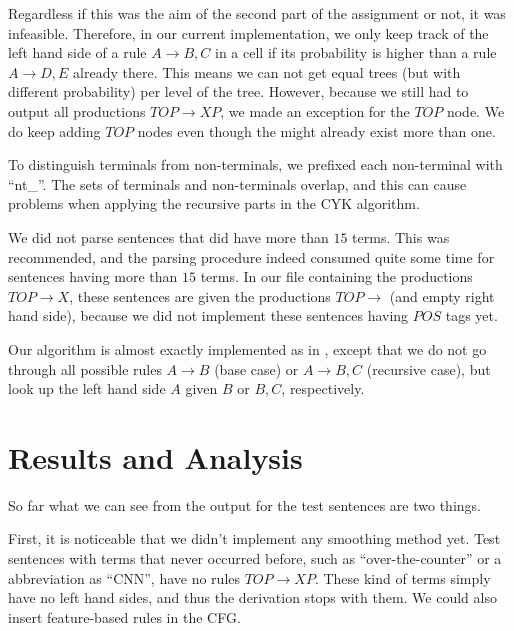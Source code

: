 \documentclass[11pt,twocolumn]{article}
\begin{document}
Regardless if this was the aim of the second part of the assignment or not, it was infeasible. Therefore, in our current implementation, we only keep track of the left hand side of a rule $A \rightarrow B, C$ in a cell if its probability is higher than a rule  $A \rightarrow D, E$ already there. This means we can not get equal trees (but with different probability) per level of the tree. However, because we still had to output all productions  $TOP \rightarrow \mathit{XP}$, we made an exception for the $TOP$ node. We do keep adding $TOP$ nodes even though the might already exist more than one.

To distinguish terminals from non-terminals, we prefixed each non-terminal with ``nt\_''. The sets of terminals and non-terminals overlap, and this can cause problems when applying the recursive parts in the CYK algorithm.

We did not parse sentences that did have more than $15$ terms. This was recommended, and the parsing procedure indeed consumed quite some time for sentences having more than $15$ terms. In our file containing the productions $TOP \rightarrow \mathit{X}$, these sentences are given the productions $TOP \rightarrow $ (and empty right hand side), because we did not implement these sentences having $POS$ tags yet.

Our algorithm is almost exactly implemented as in \cite{ss}, except that we do not go through all possible rules  $A \rightarrow B$ (base case) or  $A \rightarrow B, C$ (recursive case), but look up the left hand side $A$ given $B$ or $B, C$, respectively.


\section{Results and Analysis} \label{randa}
So far what we can see from the output for the test sentences are two things.

First, it is noticeable that we didn't implement any smoothing method yet. Test sentences with terms that never occurred before, such as ``over-the-counter'' or a abbreviation as ``CNN'',  have no rules  $TOP \rightarrow \mathit{XP}$. These kind of terms simply have no left hand sides, and thus the derivation stops with them.
We could also insert feature-based rules in the CFG.
\end{document}
